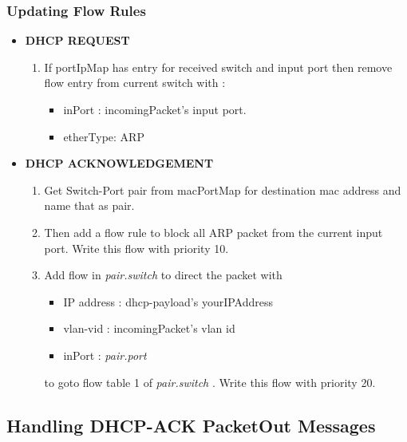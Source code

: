 \documentclass{article}
\begin{document}
\subsubsection{Updating Flow Rules}

\begin{itemize}
	\item \textbf{DHCP REQUEST}

		\begin{enumerate}
			\item If portIpMap has entry for received switch and input port then remove flow entry from current switch with :

				\begin{itemize}
					\item inPort : incomingPacket's input port.
					\item etherType: ARP
				\end{itemize}
				
		\end{enumerate}
	\item \textbf{DHCP ACKNOWLEDGEMENT}

		\begin{enumerate}
			\item Get Switch-Port pair from macPortMap for destination mac address and name that as pair.
			\item Then add a flow rule to block all ARP packet from the  current input port. Write this flow with priority 10.
			\item Add flow in \textit{pair.switch} to direct the packet with 

				\begin{itemize}

					\item IP address : dhcp-payload's yourIPAddress
					\item vlan-vid : incomingPacket's vlan id 
					\item inPort : \textit{pair.port}
				\end{itemize}

				to goto flow table 1 of \textit{pair.switch} . Write this flow with priority 20.
		\end{enumerate}
		
\end{itemize}




\subsection{Handling DHCP-ACK PacketOut Messages}
\end{document}
